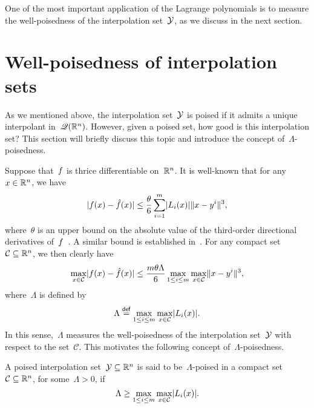 One of the most important application of the Lagrange polynomials is to measure the well-poisedness of the interpolation set~$\xpt$, as we discuss in the next section.

\section{Well-poisedness of interpolation sets}
\label{sec:poisedness}

As we mentioned above, the interpolation set~$\xpt$ is poised if it admits a unique interpolant in~$\mathscr{Q}(\mathbb{R}^n)$.
However, given a poised set, how good is this interpolation set?
This section will briefly discuss this topic and introduce the concept of~$\Lambda$-poisedness.

Suppose that~$f$ is thrice differentiable on~$\mathbb{R}^n$.
It is well-known that for any~$\iter \in \R^n$, we have
\begin{equation}
    \label{eq:Ciarlet_Raviart_0}
    \abs{\obj(\iter) - \objm(\iter)} \le \frac{\theta}{6} \sum_{i = 1}^m \abs{\lagp[i](\iter)} \norm{x - y^i}^3,
\end{equation}
where~$\theta$ is an upper bound on the absolute value of the third-order directional derivatives of~$f$~\cite[Thm.~2]{Powell_2001}.
A similar bound is established in~\cite[Thm.~2]{Ciarlet_Raviart_1972}.
For any compact set~$\mathcal{C} \subseteq \mathbb{R}^n$, we then clearly have
\begin{equation}
    \label{eq:ciarlet-raviard-bound}
    \max_{\iter \in \mathcal{C}} \abs{\obj(\iter) - \objm(\iter)} \le \frac{m \theta \Lambda}{6} \max_{1 \le i \le m} \max_{\iter \in \mathcal{C}} \norm{x - y^i}^3,
\end{equation}
where~$\Lambda$ is defined by
\begin{equation}
    \label{eq:lambda-poisedness-convex-hull}
    \Lambda \eqdef \max_{1 \le i \le m} \max_{\iter \in \mathcal{C}} \abs{\lagp[i](\iter)}.
\end{equation}
In this sense,~$\Lambda$ measures the well-poisedness of the interpolation set~$\xpt$ with respect to the set~$\mathcal{C}$.
This motivates the following concept of~$\Lambda$-poisedness.

\begin{definition}
    \label{def:lambda-poisedness}
    A poised interpolation set~$\xpt \subseteq \R^n$ is said to be~$\Lambda$-poised in a compact set~$\mathcal{C} \subseteq \mathbb{R}^n$, for some~$\Lambda > 0$, if
    \begin{equation*}
        \Lambda \ge \max_{1 \le i \le m} \max_{\iter \in \mathcal{C}} \abs{\lagp[i](\iter)}.
    \end{equation*}
\end{definition}

